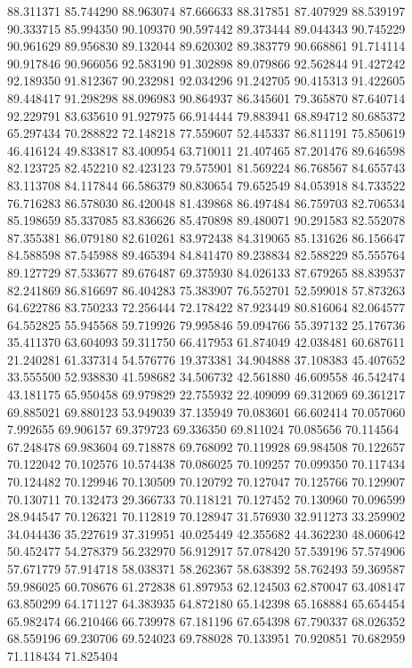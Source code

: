 88.311371
85.744290
88.963074
87.666633
88.317851
87.407929
88.539197
90.333715
85.994350
90.109370
90.597442
89.373444
89.044343
90.745229
90.961629
89.956830
89.132044
89.620302
89.383779
90.668861
91.714114
90.917846
90.966056
92.583190
91.302898
89.079866
92.562844
91.427242
92.189350
91.812367
90.232981
92.034296
91.242705
90.415313
91.422605
89.448417
91.298298
88.096983
90.864937
86.345601
79.365870
87.640714
92.229791
83.635610
91.927975
66.914444
79.883941
68.894712
80.685372
65.297434
70.288822
72.148218
77.559607
52.445337
86.811191
75.850619
46.416124
49.833817
83.400954
63.710011
21.407465
87.201476
89.646598
82.123725
82.452210
82.423123
79.575901
81.569224
86.768567
84.655743
83.113708
84.117844
66.586379
80.830654
79.652549
84.053918
84.733522
76.716283
86.578030
86.420048
81.439868
86.497484
86.759703
82.706534
85.198659
85.337085
83.836626
85.470898
89.480071
90.291583
82.552078
87.355381
86.079180
82.610261
83.972438
84.319065
85.131626
86.156647
84.588598
87.545988
89.465394
84.841470
89.238834
82.588229
85.555764
89.127729
87.533677
89.676487
69.375930
84.026133
87.679265
88.839537
82.241869
86.816697
86.404283
75.383907
76.552701
52.599018
57.873263
64.622786
83.750233
72.256444
72.178422
87.923449
80.816064
82.064577
64.552825
55.945568
59.719926
79.995846
59.094766
55.397132
25.176736
35.411370
63.604093
59.311750
66.417953
61.874049
42.038481
60.687611
21.240281
61.337314
54.576776
19.373381
34.904888
37.108383
45.407652
33.555500
52.938830
41.598682
34.506732
42.561880
46.609558
46.542474
43.181175
65.950458
69.979829
22.755932
22.409099
69.312069
69.361217
69.885021
69.880123
53.949039
37.135949
70.083601
66.602414
70.057060
7.992655
69.906157
69.379723
69.336350
69.811024
70.085656
70.114564
67.248478
69.983604
69.718878
69.768092
70.119928
69.984508
70.122657
70.122042
70.102576
10.574438
70.086025
70.109257
70.099350
70.117434
70.124482
70.129946
70.130509
70.120792
70.127047
70.125766
70.129907
70.130711
70.132473
29.366733
70.118121
70.127452
70.130960
70.096599
28.944547
70.126321
70.112819
70.128947
31.576930
32.911273
33.259902
34.044436
35.227619
37.319951
40.025449
42.355682
44.362230
48.060642
50.452477
54.278379
56.232970
56.912917
57.078420
57.539196
57.574906
57.671779
57.914718
58.038371
58.262367
58.638392
58.762493
59.369587
59.986025
60.708676
61.272838
61.897953
62.124503
62.870047
63.408147
63.850299
64.171127
64.383935
64.872180
65.142398
65.168884
65.654454
65.982474
66.210466
66.739978
67.181196
67.654398
67.790337
68.026352
68.559196
69.230706
69.524023
69.788028
70.133951
70.920851
70.682959
71.118434
71.825404
